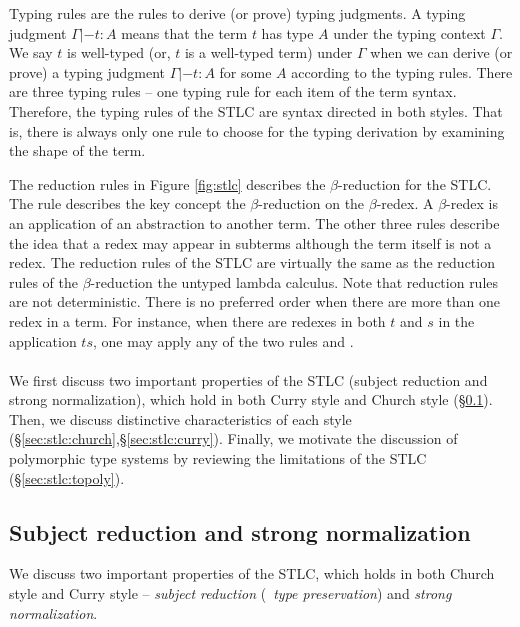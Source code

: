 Typing rules are the rules to derive (or prove) typing judgments.
A typing judgment $\Gamma |- t : A$ means that the term $t$ has type $A$
under the typing context $\Gamma$. We say $t$ is well-typed
(or, $t$ is a well-typed term) under $\Gamma$ when we can derive (or prove)
a typing judgment $\Gamma |- t : A$ for some $A$ according to the typing rules.
There are three typing rules --
one typing rule for each item of the term syntax.
Therefore, the typing rules of the STLC are syntax directed in both styles.
That is, there is always only one rule to choose for the typing derivation
by examining the shape of the term.
 
The reduction rules in Figure \ref{fig:stlc} describes the $\beta$-reduction
for the STLC. The  rule describes the key concept
the $\beta$-reduction on the $\beta$-redex. A $\beta$-redex is an application
of an abstraction to another term. The other three rules describe the idea
that a redex may appear in subterms although the term itself is not a redex.
The reduction rules of the STLC are virtually the same as the reduction rules
of the $\beta$-reduction the untyped lambda calculus. Note that reduction rules
are not deterministic. There is no preferred order when there are more than one
redex in a term. For instance, when there are redexes in both $t$ and $s$
in the application $t s$, one may apply any of the two rules 
and .

\paragraph{}
We first discuss two important properties of the STLC
(subject reduction and strong normalization), which hold
in both Curry style and Church style (\S\ref{sec:stlc:srsn}).
Then, we discuss distinctive characteristics of each style
(\S\ref{sec:stlc:church},\S\ref{sec:stlc:curry}).
Finally, we motivate the discussion of polymorphic type systems
by reviewing the limitations of the STLC (\S\ref{sec:stlc:topoly}).

\subsection{Subject reduction and strong normalization}\label{sec:stlc:srsn}
We discuss two important properties of the STLC, which holds in both
Church style and Curry style -- \emph{subject reduction} (\aka\
\emph{type preservation}) and \emph{strong normalization}.


